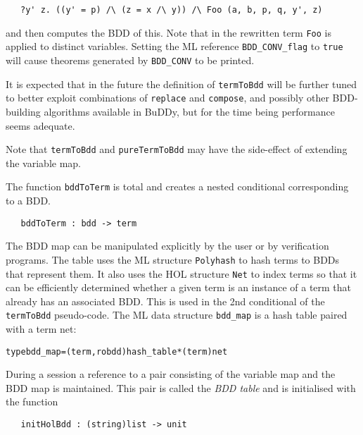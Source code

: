 \documentclass[12pt]{article}
\newcommand{\bnind}[1]{\index[MLbn]{#1}}
\renewcommand{\t}[1]{\mbox{\tt #1}}
\newcommand{\ty}[1]{\mbox{\tt #1}}
\newcommand{\ml}[1]{{\tt #1}}
\newcommand\HOL{HOL\xspace}
\newcommand{\Buddy}{BuDDy\xspace}
\newcommand\fun{\mbox{\tt{->}}}
\begin{document}
\smallskip

~~~{\verb+?y' z. ((y' = p) /\ (z = x /\ y)) /\ Foo (a, b, p, q, y', z)+}

\smallskip

and then computes the BDD of this. Note that in the rewritten term \t{Foo}
is applied to distinct variables. Setting the ML reference \t{BDD\_CONV\_flag}
to \t{true} will cause theorems generated by \t{BDD\_CONV} to be printed.

It is expected that in the future the definition of \t{termToBdd} will
be further tuned to better exploit combinations of \t{replace} and
\t{compose}, and possibly other BDD-building algorithms available in \Buddy, but
for the time being performance seems adequate.


Note that \t{termToBdd} and \t{pureTermToBdd} may have the
side-effect of extending the variable map.

The function \ml{bddToTerm} is total and creates a nested conditional corresponding
to a BDD. 

%
%
%

\begin{verbatim}
   bddToTerm : bdd -> term
\end{verbatim}\bnind{\ml{bddToTerm}}

The BDD  map can be manipulated explicitly by the user or by verification
programs. The table uses the ML structure \t{Polyhash} to hash terms to
BDDs that represent them. It also uses the \HOL{} structure \t{Net} to
index terms so that it can be efficiently determined whether a given
term is an instance of a term that already has an associated BDD. This
is used in the 2nd conditional of the \t{termToBdd} pseudo-code. The
ML data structure \t{bdd\_map} is a hash table paired with a term net:

\begin{alltt}
type bdd_map = (term, robdd)hash_table * (term)net
\end{alltt}

During a session a reference to a pair consisting of the
variable map and  the BDD map is maintained. This
pair is called the {\it{BDD table\/}} and is initialised
with the function

%
%

\begin{verbatim}
   initHolBdd : (string)list -> unit
\end{verbatim}\bnind{\ml{initHolBdd}}
\end{document}
